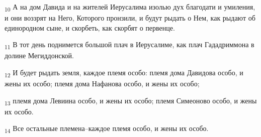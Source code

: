\begin{tcolorbox}
\textsubscript{10} А на дом Давида и на жителей Иерусалима изолью дух благодати и умиления, и они воззрят на Него, Которого пронзили, и будут рыдать о Нем, как рыдают об единородном сыне, и скорбеть, как скорбят о первенце.
\end{tcolorbox}
\begin{tcolorbox}
\textsubscript{11} В тот день поднимется большой плач в Иерусалиме, как плач Гададриммона в долине Мегиддонской.
\end{tcolorbox}
\begin{tcolorbox}
\textsubscript{12} И будет рыдать земля, каждое племя особо: племя дома Давидова особо, и жены их особо; племя дома Нафанова особо, и жены их особо;
\end{tcolorbox}
\begin{tcolorbox}
\textsubscript{13} племя дома Левиина особо, и жены их особо; племя Симеоново особо, и жены их особо.
\end{tcolorbox}
\begin{tcolorbox}
\textsubscript{14} Все остальные племена--каждое племя особо, и жены их особо.
\end{tcolorbox}
